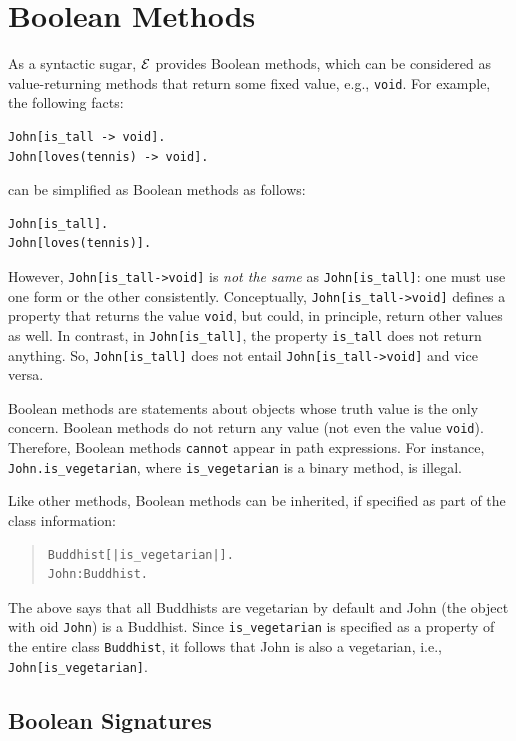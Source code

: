 \documentclass[11pt]{article}
\newcommand{\ERGO}{\mbox{\ensuremath{\cal{E}}\smaller{{\sc{RGO}}}}\xspace}
\newcommand{\FLSYSTEM}{\ERGO}
\begin{document}
\section{Boolean Methods}


As a syntactic sugar, \FLSYSTEM provides Boolean methods, which can be
considered as value-returning methods that return some fixed value, e.g.,
{\tt void}. For example, the following facts:
\begin{verbatim}
John[is_tall -> void].
John[loves(tennis) -> void].
\end{verbatim}
can be simplified as Boolean methods as follows:
\begin{verbatim}
John[is_tall].
John[loves(tennis)].
\end{verbatim}
However, \texttt{John[is\_tall->void]} is \emph{not the same} as
\texttt{John[is\_tall]}: one must use one form or the other consistently.
Conceptually, \texttt{John[is\_tall->void]} defines a property that returns
the value \texttt{void}, but could, in principle, return other values as well.
In contrast, in \texttt{John[is\_tall]},
the property \texttt{is\_tall}  does not return anything.
So, \texttt{John[is\_tall]} does not entail \texttt{John[is\_tall->void]}
and vice versa.

Boolean methods are statements about objects whose truth
value is the only concern. Boolean methods do not return any value (not
even the value {\tt void}). Therefore, Boolean methods {\tt cannot} appear
in path expressions. For instance, \mbox{\tt John.is\_vegetarian}, where
{\tt is\_vegetarian} is a binary method, is illegal.

Like other methods, Boolean methods can be inherited, if specified as part
of the class information:
\begin{quote}
\begin{verbatim}
Buddhist[|is_vegetarian|].
John:Buddhist.
\end{verbatim}
\end{quote}
The above says that all Buddhists are vegetarian by default
and John (the object with
oid {\tt John}) is a Buddhist. Since \verb|is_vegetarian| is specified as a
property of the entire class \texttt{Buddhist},
it follows that John is also a vegetarian, i.e.,
\verb|John[is_vegetarian]|.

\subsection{Boolean Signatures}
\end{document}
